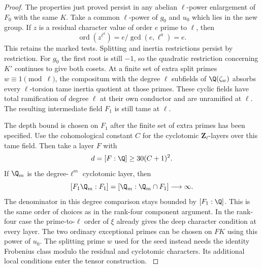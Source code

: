 \begin{proof}

The properties just proved persist in any abelian
\(\ell\)-power enlargement of \(F_0\) with the same \(K\).
Take a common \(\ell\)-power of \(g_0\) and \(u_0\)
which lies in the new group. If \(z\) is a residual character value of order \(e\) prime to \(\ell\), then
\[
 \operatorname{ord}(z^{\ell^a})=e/\gcd(e,\ell^a)=e .
\] This retains the marked tests. Splitting and
inertia restrictions persist by restriction. For
\(g_0\) the first root is still \(-1\), so the
quadratic restriction concerning \(K'\) continues to
give both cosets. At a finite set of extra split primes
\(w\equiv1\pmod\ell\), the compositum with the degree
\(\ell\) subfields of \(\Q(\zeta_w)\) absorbs every
\(\ell\)-torsion tame inertia quotient at those primes.
These cyclic fields have total ramification of degree
\(\ell\) at their own conductor and are unramified
at \(\ell\). The resulting intermediate field \(F_1\)
is still tame at \(\ell\).

The depth bound is chosen on \(F_1\) after the finite set
of extra primes has been specified. Use the cohomological
constant \(C\) for the cyclotomic \(\mathbf Z_\ell\)-layers
over this tame field. Then take a layer \(F\) with
\[
 d=[F:\Q]\geq30(C+1)^2.
\]
If \(\Q_m\) is the degree-\(\ell^m\) cyclotomic layer, then
\[
          [F_1\Q_m:F_1]=[\Q_m:\Q_m\cap F_1]\longrightarrow\infty .
\]
The denominator in this degree comparison stays bounded by
\([F_1:\Q]\).
This is the same order of choices as in the rank-four
component argument. In the rank-four case the prime-to-\(\ell\)
order of \(\xi\) already gives the deep character
condition at every layer. The two ordinary exceptional
primes can be chosen on \(FK\) using this power of \(u_0\). The splitting prime \(w\) used for the
seed instead needs the identity Frobenius class modulo
the residual and cyclotomic characters. Its additional
local conditions enter the tensor construction.
\label{cor:ordinary-count-iii-tower-1}
\end{proof}
